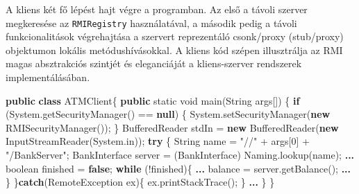 \documentclass[
]{article}
\newenvironment{Shaded}{}{}
\newcommand{\BuiltInTok}[1]{\textcolor[rgb]{0.00,0.50,0.00}{#1}}
\newcommand{\ControlFlowTok}[1]{\textcolor[rgb]{0.00,0.44,0.13}{\textbf{#1}}}
\newcommand{\DataTypeTok}[1]{\textcolor[rgb]{0.56,0.13,0.00}{#1}}
\newcommand{\DecValTok}[1]{\textcolor[rgb]{0.25,0.63,0.44}{#1}}
\newcommand{\FunctionTok}[1]{\textcolor[rgb]{0.02,0.16,0.49}{#1}}
\newcommand{\KeywordTok}[1]{\textcolor[rgb]{0.00,0.44,0.13}{\textbf{#1}}}
\newcommand{\NormalTok}[1]{#1}
\newcommand{\OperatorTok}[1]{\textcolor[rgb]{0.40,0.40,0.40}{#1}}
\newcommand{\StringTok}[1]{\textcolor[rgb]{0.25,0.44,0.63}{#1}}
\begin{document}
A kliens két fő lépést hajt végre a programban. Az első a távoli szerver
megkeresése az \texttt{RMIRegistry} használatával, a második pedig a
távoli funkcionalitások végrehajtása a szervert reprezentáló csonk/proxy
(stub/proxy) objektumon lokális metódushívásokkal. A kliens kód szépen
illusztrálja az RMI magas absztrakciós szintjét és eleganciáját a
kliens-szerver rendszerek implementálásában.

\begin{Shaded}
\begin{Highlighting}[]
\KeywordTok{public} \KeywordTok{class}\NormalTok{ ATMClient}\OperatorTok{\{}
    \KeywordTok{public} \DataTypeTok{static} \DataTypeTok{void} \FunctionTok{main}\OperatorTok{(}\BuiltInTok{String}\NormalTok{ args}\OperatorTok{[])} \OperatorTok{\{}
        \ControlFlowTok{if} \OperatorTok{(}\BuiltInTok{System}\OperatorTok{.}\FunctionTok{getSecurityManager}\OperatorTok{()} \OperatorTok{==} \KeywordTok{null}\OperatorTok{)} \OperatorTok{\{}
            \BuiltInTok{System}\OperatorTok{.}\FunctionTok{setSecurityManager}\OperatorTok{(}\KeywordTok{new} \BuiltInTok{RMISecurityManager}\OperatorTok{());}
        \OperatorTok{\}}
        \BuiltInTok{BufferedReader}\NormalTok{ stdIn }\OperatorTok{=} \KeywordTok{new} \BuiltInTok{BufferedReader}\OperatorTok{(}\KeywordTok{new} \BuiltInTok{InputStreamReader}\OperatorTok{(}\BuiltInTok{System}\OperatorTok{.}\FunctionTok{in}\OperatorTok{));}
        \ControlFlowTok{try} \OperatorTok{\{}
            \BuiltInTok{String}\NormalTok{ name }\OperatorTok{=} \StringTok{"//"} \OperatorTok{+}\NormalTok{ args}\OperatorTok{[}\DecValTok{0}\OperatorTok{]} \OperatorTok{+} \StringTok{"/BankServer"}\OperatorTok{;}
\NormalTok{            BankInterface server }\OperatorTok{=} \OperatorTok{(}\NormalTok{BankInterface}\OperatorTok{)} \BuiltInTok{Naming}\OperatorTok{.}\FunctionTok{lookup}\OperatorTok{(}\NormalTok{name}\OperatorTok{);}
            \KeywordTok{...}
            \DataTypeTok{boolean}\NormalTok{ finished }\OperatorTok{=} \KeywordTok{false}\OperatorTok{;}
            \ControlFlowTok{while} \OperatorTok{(!}\NormalTok{finished}\OperatorTok{)\{}
                \KeywordTok{...}
\NormalTok{                balance }\OperatorTok{=}\NormalTok{ server}\OperatorTok{.}\FunctionTok{getBalance}\OperatorTok{();}
                \KeywordTok{...}
            \OperatorTok{\}}
        \OperatorTok{\}}\ControlFlowTok{catch}\OperatorTok{(}\BuiltInTok{RemoteException}\NormalTok{ ex}\OperatorTok{)\{}
\NormalTok{            ex}\OperatorTok{.}\FunctionTok{printStackTrace}\OperatorTok{();}
        \OperatorTok{\}}
        \KeywordTok{...}
    \OperatorTok{\}}
\OperatorTok{\}}
\end{Highlighting}
\end{Shaded}
\end{document}
